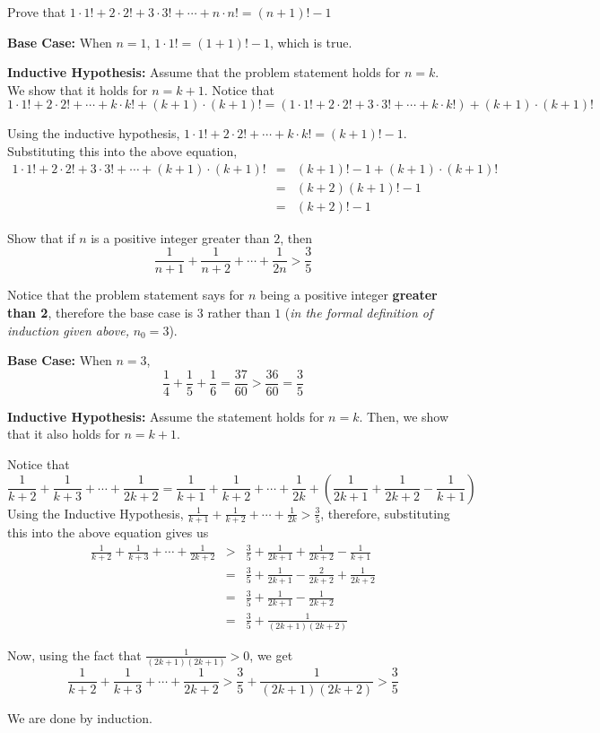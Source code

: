\begin{exmp}  Prove that $1\cdot 1!+2\cdot 2!+3\cdot 3!+\cdots+n\cdot n!=(n+1)!-1$  \end{exmp}
\begin{soln}
\textbf{Base Case:}  When $n=1$, $1\cdot 1!=\left(1+1\right)!-1$, which is true.

\textbf{Inductive Hypothesis:}  Assume that the problem statement holds for $n=k$.  We show that it holds for $n=k+1$.  Notice that $$1\cdot 1!+2\cdot 2!+\cdots+k\cdot k!+(k+1)\cdot (k+1)!=\left(1\cdot 1!+2\cdot 2!+3\cdot 3!+\cdots+k\cdot k!\right)+(k+1)\cdot (k+1)!$$

Using the inductive hypothesis, $1\cdot 1!+2\cdot 2!+\cdots+k\cdot k!=(k+1)!-1$.  Substituting this into the above equation, \begin{eqnarray*} 1\cdot 1!+2\cdot 2!+3\cdot 3!+\cdots+(k+1)\cdot (k+1)!&=&(k+1)!-1+(k+1)\cdot (k+1)! \\ &=&(k+2)(k+1)!-1 \\ &=&(k+2)!-1 \end{eqnarray*}
\end{soln}
\begin{exmp}  Show that if $n$ is a positive integer greater than $2$, then $$\frac{1}{n+1}+\frac{1}{n+2}+\cdots+\frac{1}{2n}>\frac{3}{5}$$  \end{exmp}
\begin{soln}  Notice that the problem statement says for $n$ being a positive integer \textbf{greater than 2}, therefore the base case is $3$ rather than $1$ (\textit{in the formal definition of induction given above,  } $n_0=3$).  

\textbf{Base Case:}  When $n=3$, $$\frac{1}{4}+\frac{1}{5}+\frac{1}{6}=\frac{37}{60}>\frac{36}{60}=\frac{3}{5}$$

\textbf{Inductive Hypothesis:}  Assume the statement holds for $n=k$.  Then, we show that it also holds for $n=k+1$.  

Notice that 
$$\frac{1}{k+2}+\frac{1}{k+3}+\cdots+\frac{1}{2k+2}=\frac{1}{k+1}+\frac{1}{k+2}+\cdots+\frac{1}{2k}+\left(\frac{1}{2k+1}+\frac{1}{2k+2}-\frac{1}{k+1}\right)$$
Using the Inductive Hypothesis, $\frac{1}{k+1}+\frac{1}{k+2}+\cdots+\frac{1}{2k}>\frac{3}{5}$, therefore, substituting this into the above equation gives us \begin{eqnarray*} \frac{1}{k+2}+\frac{1}{k+3}+\cdots+\frac{1}{2k+2}&>&\frac35+\frac{1}{2k+1}+\frac{1}{2k+2}-\frac{1}{k+1} \\ &=& \frac35+\frac{1}{2k+1}-\frac{2}{2k+2}+\frac{1}{2k+2} \\ &=& \frac35+\frac{1}{2k+1}-\frac{1}{2k+2} \\ &=& \frac35+\frac{1}{(2k+1)(2k+2)} \end{eqnarray*}

Now, using the fact that $\frac{1}{(2k+1)(2k+1)}>0$, we get $$\frac{1}{k+2}+\frac{1}{k+3}+\cdots+\frac{1}{2k+2}>\frac35+\frac{1}{(2k+1)(2k+2)}>\frac35$$

We are done by induction.  \end{soln}

